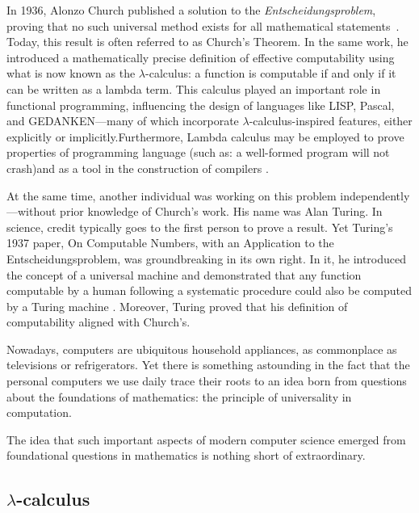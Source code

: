  In 1936, Alonzo Church published a solution to the \emph{Entscheidungsproblem}, proving that no such universal method exists for all mathematical statements~\cite{church1936}. Today, this result is often referred to as Church’s Theorem. In the same work, he introduced a mathematically precise definition of effective computability using what is now known as the $\lambda$-calculus: a function is computable if
 and only if it can be written as a lambda term. This calculus played an important role in functional programming, influencing the design of languages like LISP, Pascal, and GEDANKEN—many of which incorporate $\lambda$-calculus-inspired features, either explicitly or implicitly.Furthermore, Lambda calculus may be employed to prove properties of programming language (such as: a well-formed program will not crash)and as a tool in the construction of compilers \cite{jonesImplementationFunctionalProgramming}.


 At the same time, another individual was working on this problem independently—without prior knowledge of Church’s work. His name was Alan Turing. In science, credit typically goes to the first person to prove a result. Yet Turing’s 1937 paper, On Computable Numbers, with an Application to the Entscheidungsproblem, was groundbreaking in its own right. In it, he introduced the concept of a universal machine and demonstrated that any function computable by a human following a systematic procedure could also be computed by a Turing machine \cite{turingComputableNumbersApplication1937}. Moreover, Turing proved that his definition of computability aligned with Church’s.


Nowadays, computers are ubiquitous household appliances, as commonplace as televisions or refrigerators. Yet there is  something astounding in the fact that the personal computers we use daily trace their roots to an idea born from questions about the foundations of mathematics: the principle of universality in computation. 

The idea that such important aspects of modern computer science emerged from foundational questions in mathematics is nothing short of extraordinary.




\subsection*{$\lambda$-calculus}

